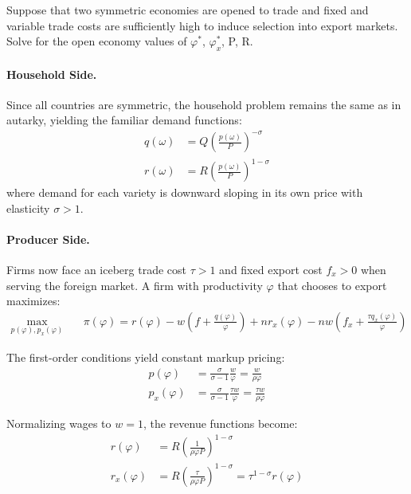 Suppose that two symmetric economies are opened to trade and fixed and variable trade costs are sufficiently high to induce selection into export markets. Solve for the open economy values of $\varphi^*$, $\varphi^*_x$, P, R.

\begin{solution}
	\paragraph{Household Side.} Since all countries are symmetric, the household problem remains the same as in autarky, yielding the familiar demand functions:
		\begin{align*}
			q(\omega) &= Q \left( \frac{p(\omega)}{P} \right)^{-\sigma}\\
			r(\omega) &= R \left( \frac{p(\omega)}{P} \right)^{1 - \sigma}
		\end{align*}
		where demand for each variety is downward sloping in its own price with elasticity $\sigma>1$.

		\paragraph{Producer Side.} Firms now face an iceberg trade cost $\tau>1$ and fixed export cost $f_x>0$ when serving the foreign market. A firm with productivity $\varphi$ that chooses to export maximizes:
		\begin{align*}
			\max_{p(\varphi), p_x(\varphi)} \quad & \pi(\varphi) = r(\varphi) - w \left( f + \frac{q(\varphi)}{\varphi} \right) + n r_x(\varphi) - n w \left( f_x + \frac{\tau q_x(\varphi)}{\varphi} \right)
		\end{align*}

		The first-order conditions yield constant markup pricing:
		\begin{align*}
			p(\varphi) &= \frac{\sigma}{\sigma - 1} \frac{w}{\varphi} = \frac{w}{\rho \varphi} \\
			p_x(\varphi) &= \frac{\sigma}{\sigma - 1} \frac{\tau w}{\varphi} = \frac{\tau w}{\rho \varphi}
		\end{align*}

		Normalizing wages to $w=1$, the revenue functions become:
		\begin{align*}
			r(\varphi) &= R \left( \frac{1}{\rho \varphi P} \right)^{1 - \sigma} \\
			r_x(\varphi) &= R \left( \frac{\tau}{\rho \varphi P} \right)^{1 - \sigma} = \tau^{1-\sigma} r(\varphi)
		\end{align*}


\end{solution}
